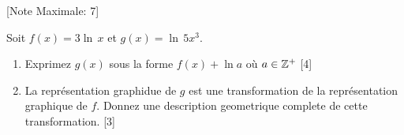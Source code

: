 \begin{question}
  \hspace*{\fill} [Note Maximale: 7]\par
  \noindent Soit $f(x) = 3\ln\,x$ et $g(x) = \ln\,5x^3$.\par
  \begin{enumerate}[label=(\alph*)]
    \item Exprimez $g(x)$ sous la forme $f(x)+\ln a$ où $a \in \mathbb{Z}^+$\hspace*{\fill} [4]
    \item La représentation graphidue de $g$ est une transformation de la représentation graphique de $f$.  Donnez une description geometrique complete de cette transformation. \hspace*{\fill} [3]
  \end{enumerate}
\end{question}
